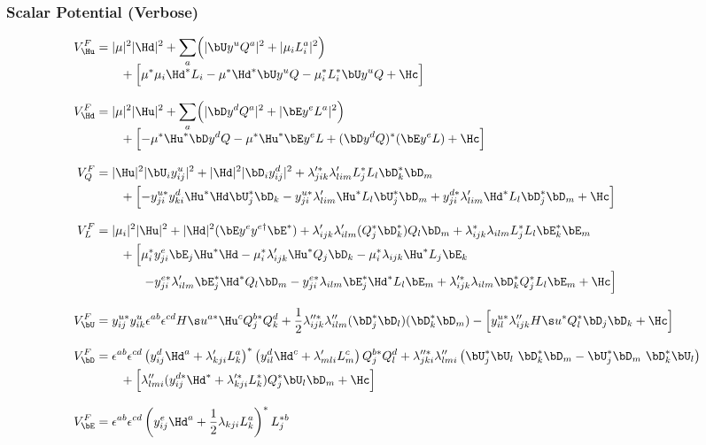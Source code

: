 \subsubsection{Scalar Potential (Verbose)}
\vspace{-24pt}
\begin{align}
 V^F_{\Hu}&=
 |\mu|^2|\Hd|^2+\sum_a\Bigl(|\bU y^u Q^a|^2+|\mu_iL_i^a|^2\Bigr)
\\[-6pt]&\qquad\notag
+\Bigl[
 \mu^*\mu_i\Hd^*L_i - \mu^*\Hd^*\bU y^u Q - \mu_i^*L_i^*\bU y^u Q+\Hc
\Bigr]\\[8pt]
 V^F_{\Hd}&=
 |\mu|^2|\Hu|^2+\sum_a\Bigl(|\bD y^dQ^a|^2+|\bE y^e L^a|^2\Bigr)
\\[-6pt]&\qquad\notag
+\Bigl[
 -\mu^*\Hu^*\bD y^d Q-\mu^*\Hu^* \bE y^e L+(\bD y^d Q)^*(\bE y^e L)+\Hc
\Bigr]\\[8pt]
 V^F_{Q}&=
 |\Hu|^2|\bU_iy^u_{ij}|^2
+|\Hd|^2|\bD_iy^d_{ij}|^2
+\lambda'^*_{jik}\lambda'_{lim}L^*_jL_l\bD_k^*\bD_m
\\&\qquad\notag
+\Bigl[
-y^{u*}_{ji}y^d_{ki} \Hu^*\Hd\bU_j^*\bD_k
-y^{u*}_{ji}\lambda'_{lim}\Hu^*L_l\bU^*_j\bD_m
+y^{d*}_{ji}\lambda'_{lim}\Hd^*L_l\bD^*_j\bD_m+\Hc
\Bigr]\\[8pt]
 V^F_{L}&=
|\mu_i|^2|\Hu|^2+|\Hd|^2(\bE y^e y^{e\dagger}\bE^*)+\lambda'_{ijk}\lambda'_{ilm}(Q_j^*\bD^*_k)Q_l\bD_m
+\lambda^*_{ijk}\lambda_{ilm}L_j^*L_l\bE_k^*\bE_m
\notag\\&\qquad
+\Bigl[
\mu_i^*y^e_{ji}\bE_j\Hu^*\Hd-\mu^*_i\lambda'_{ijk}\Hu^*Q_j\bD_k-\mu_i^*\lambda_{ijk}\Hu^*L_j\bE_k
\Bigr.\\&\qquad\qquad\Bigl.\notag
-y^{e*}_{ji}\lambda'_{ilm}\bE^*_j\Hd^*Q_l\bD_m
-y^{e*}_{ji}\lambda_{ilm} \bE^*_j\Hd^*L_l\bE_m
+\lambda'^*_{ijk}\lambda_{ilm}\bD_k^*Q_j^*L_l\bE_m+\Hc
\Bigr]\\[8pt]
 V^F_{\bU}&=
 y^{u*}_{ij}y^u_{ik}\epsilon^{ab}\epsilon^{cd}H\s u^{a*}\Hu^cQ_j^{b*}Q_k^d
+\frac12\lambda''^*_{ijk}\lambda''_{ilm}(\bD^*_j\bD_l)(\bD^*_k\bD_m)
-\Bigl[y^{u*}_{il}\lambda''_{ijk}H\s u^*Q^*_l\bD_j\bD_k+\Hc\Bigr]\\[8pt]
 V^F_{\bD}&=
 \epsilon^{ab}\epsilon^{cd}
 \left(y^d_{ij}\Hd^a+\lambda'_{kji}L_k^a\right)^*\left(y^d_{il}\Hd^c+\lambda'_{mli}L^c_m\right)Q_j^{b*}Q_l^d
+\lambda''^*_{jki}\lambda''_{lmi}\left(\bU^*_j\bU_l\ \bD^*_k\bD_m-\bU^*_j\bD_m\ \bD^*_k\bU_l\right)
\notag\\&\qquad
+\Bigl[\lambda''_{lmi}(y^{d*}_{ij}\Hd^*+\lambda'^*_{kji}L_k^*)Q_j^*\bU_l\bD_m+\Hc\Bigr]\\[8pt]
 V^F_{\bE}&=
\epsilon^{ab}\epsilon^{cd}
\left(y^e_{ij}\Hd^a+\frac12\lambda_{kji}L_k^a\right)^*L^{*b}_j

\end{align}
